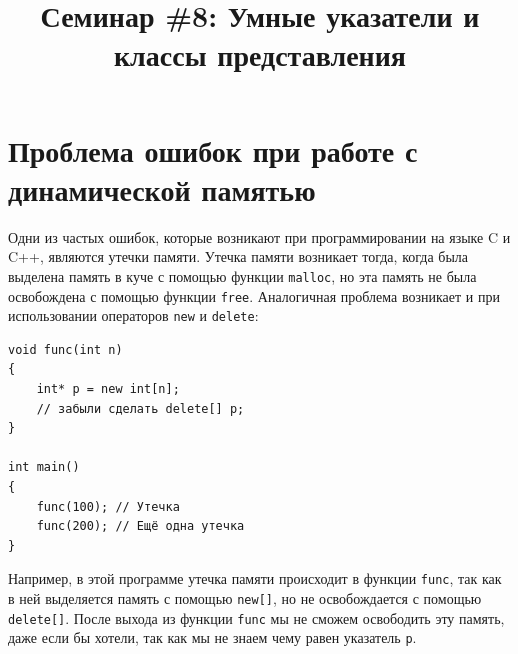 \documentclass{article}
\begin{document}


\title{Семинар \#8: Умные указатели и классы представления \vspace{-5ex}}\date{}\maketitle

\section*{Проблема ошибок при работе с динамической памятью}
Одни из частых ошибок, которые возникают при программировании на языке C и C++, являются утечки памяти. Утечка памяти возникает тогда, когда была выделена память в куче с помощью функции \texttt{malloc}, но эта память не была освобождена с помощью функции \texttt{free}. Аналогичная проблема возникает и при использовании операторов \texttt{new} и \texttt{delete}:
\begin{lstlisting}
void func(int n) 
{
    int* p = new int[n];
    // забыли сделать delete[] p;
}

int main() 
{
    func(100); // Утечка
    func(200); // Ещё одна утечка
}
\end{lstlisting}

Например, в этой программе утечка памяти происходит в функции \texttt{func}, так как в ней выделяется память с помощью \texttt{new[]}, но не освобождается с помощью \texttt{delete[]}. После выхода из функции \texttt{func} мы не сможем освободить эту память, даже если бы хотели, так как мы не знаем чему равен указатель \texttt{p}.
\end{document}
